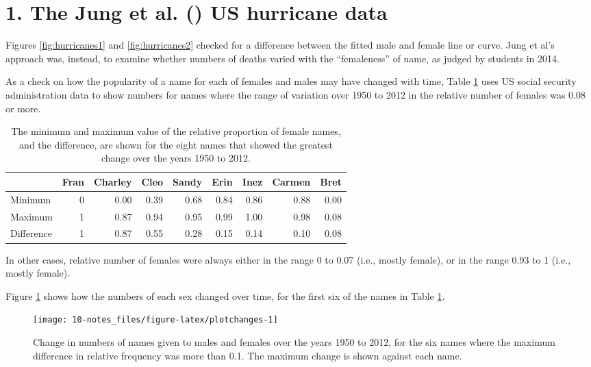 \documentclass[
  10ptls,
  b5paper]{book}
\begin{document}
\section*{\texorpdfstring{1. The Jung et al. () US hurricane data}{1. The Jung et al. (2014) US hurricane data}}\label{hurricanes}

Figures \ref{fig:hurricanes1} and \ref{fig:hurricanes2} checked for a difference between the fitted male and female line or curve. Jung et al's approach was, instead, to examine whether numbers of deaths varied with the ``femaleness'' of name, as judged by students in 2014.

As a check on how the popularity of a name for each of females and males may have changed with time, Table \ref{tab:changetab} uses US social security administration data to show numbers for names where the range of variation over 1950 to 2012 in the relative number of females was 0.08 or more.

\begin{table}

\caption{\label{tab:changetab}The minimum and maximum value of the relative proportion
of female names, and the difference, are shown for the eight names
that showed the greatest change over the years 1950 to 2012.}
\centering
\begin{tabular}[t]{l|r|r|r|r|r|r|r|r}
\hline
  & Fran & Charley & Cleo & Sandy & Erin & Inez & Carmen & Bret\\
\hline
Minimum & 0 & 0.00 & 0.39 & 0.68 & 0.84 & 0.86 & 0.88 & 0.00\\
\hline
Maximum & 1 & 0.87 & 0.94 & 0.95 & 0.99 & 1.00 & 0.98 & 0.08\\
\hline
Difference & 1 & 0.87 & 0.55 & 0.28 & 0.15 & 0.14 & 0.10 & 0.08\\
\hline
\end{tabular}
\end{table}

In other cases, relative number of females were always either in the range 0 to 0.07 (i.e., mostly female), or in the range 0.93 to 1 (i.e., mostly female).

Figure \ref{fig:plotchanges} shows how the numbers of each sex changed over time, for the first six of the names in Table \ref{tab:changetab}.

\begin{figure}

{\centering \texttt{[image: 10-notes\_files/figure-latex/plotchanges-1]} 

}

\caption{Change in numbers of names given to males and females
over the years 1950 to 2012, for the six names where the 
maximum difference in relative frequency was more than 0.1.
The maximum change is shown against each name.}\label{fig:plotchanges}
\end{figure}
\end{document}
